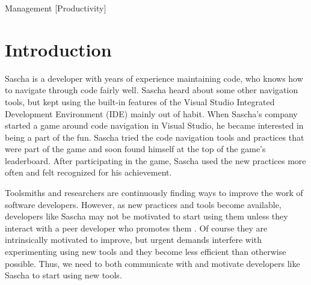 \documentclass{sig-alternate}
\begin{document}
 {Management} [Productivity]



\section{Introduction}

Sascha is a developer with years of experience maintaining code, who knows how to navigate through code fairly well.  Sascha heard about some other navigation tools, but kept using the built-in features of the Visual Studio Integrated Development Environment (IDE) mainly out of habit.  When Sascha's company started a game around code navigation in Visual Studio, he became interested in being a part of the fun.  Sascha tried the code navigation tools and practices that were part of the game and soon found himself at the top of the game's leaderboard.  After participating in the game, Sascha used the new practices more often and felt recognized for his achievement.

Toolsmiths and researchers are continuously finding ways to improve the work of software developers.  However, as new practices and tools become available, developers like Sascha may not be motivated to start using them unless they interact with a peer developer who promotes them \cite{wbsnipes:Hill2011Peer}.    Of course they are intrinsically motivated to improve, but urgent demands interfere with experimenting using new tools and they become less efficient than otherwise possible.  Thus, we need to both communicate with and motivate developers like Sascha to start using new tools.

\end{document}
